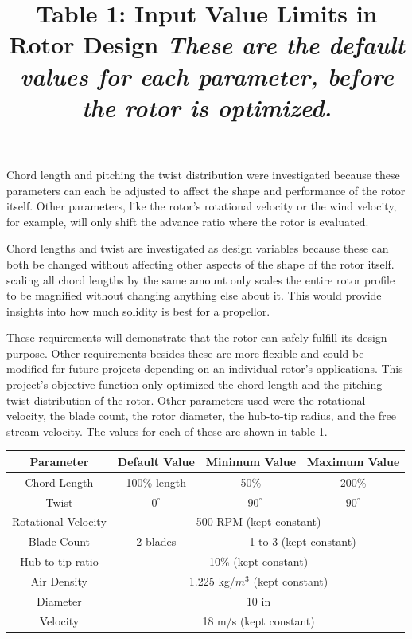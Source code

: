 \documentclass{article}
\begin{document}
\noindent Chord length and pitching the twist distribution were investigated because these parameters can each be adjusted to affect the shape and performance of the rotor itself. Other parameters, like the rotor's rotational velocity or the wind velocity, for example, will only shift the advance ratio where the rotor is evaluated. \newline

Chord lengths and twist are investigated as design variables because these can both be changed without affecting other aspects of the shape of the rotor itself. scaling all chord lengths by the same amount only scales the entire rotor profile to be magnified without changing anything else about it. This would provide insights into how much solidity is best for a propellor. \newline

\noindent These requirements will demonstrate that the rotor can safely fulfill its design purpose. Other requirements besides these are more flexible and could be modified for future projects depending on an individual rotor's applications. This project's objective function only optimized the chord length and the pitching twist distribution of the rotor. Other parameters used were the rotational velocity, the blade count, the rotor diameter, the hub-to-tip radius, and the free stream velocity. The values for each of these are shown in table 1. \newline

\centering
\title{Table 1: Input Value Limits in Rotor Design \newline}
\title{\emph{These are the default values for each parameter, before the rotor is optimized.}} \label{table:1} \newline
\begin{tabular}{| c | c | c | c |}
	 \hline
  	 \textbf{Parameter} & \textbf{Default Value} & \textbf{Minimum Value} & \textbf{Maximum Value} \\ \hline
	 Chord Length & 100\% length & 50\% & 200\% \\ \hline
	 Twist & $0^{\circ}$ & $-90^{\circ}$ & $90^{\circ}$ \\ \hline
	 Rotational Velocity & \multicolumn{3}{c|}{500 RPM (kept constant)} \\ \hline
	 Blade Count & 2 blades & \multicolumn{2}{c|}{1 to 3 (kept constant)}\\ \hline
	 Hub-to-tip ratio & \multicolumn{3}{c|}{10\% (kept constant)} \\ \hline
	 Air Density & \multicolumn{3}{c|}{1.225 kg/$m^{3}$ (kept constant)} \\ \hline
	 Diameter & \multicolumn{3}{c|}{10 in} \\ \hline
	 Velocity & \multicolumn{3}{c|}{18 m/s (kept constant)} \\ \hline
\end{tabular} \break \newline
\end{document}
